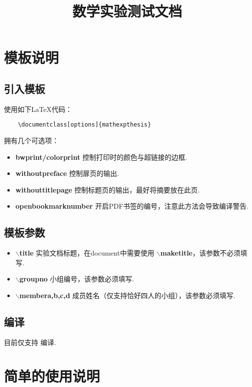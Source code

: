 \documentclass[bwprint, withouttitlepage, openfonts]{mathexpthesis}
\title{数学实验测试文档}
\begin{document}
\maketitle
\tableofcontents
\newpage
\section{模板说明}
\subsection{引入模板}
使用如下\LaTeX 代码：
\begin{verbatim}
    \documentclass[options]{mathexpthesis}
\end{verbatim}

拥有几个可选项：
\begin{itemize}[itemindent=2em]
    \item \textbf{bwprint/colorprint} 控制打印时的颜色与超链接的边框.
    \item \textbf{withoutpreface} 控制扉页的输出.
    \item \textbf{withouttitlepage} 控制标题页的输出，最好将摘要放在此页.
    \item \textbf{openbookmarknumber} 开启PDF书签的编号，注意此方法会导致编译警告.
\end{itemize}

\subsection{模板参数}
\begin{itemize}[itemindent=2em]
    \item \textbf{$\backslash$title} 实验文档标题，在document中需要使用 \textbf{$\backslash$maketitle}，该参数不必须填写.
    \item \textbf{$\backslash$groupno} 小组编号，该参数必须填写.
    \item \textbf{$\backslash$membera,b,c,d} 成员姓名（仅支持恰好四人的小组），该参数必须填写.
\end{itemize}

\subsection{编译}
目前仅支持 编译.

\section{简单的使用说明}
\end{document}
